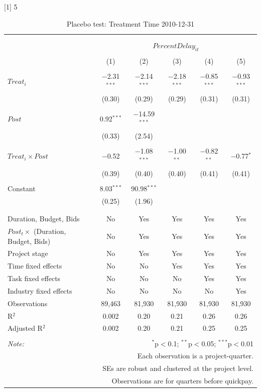 \documentclass[
]{article}
\begin{document}
{[}1{]} 5

\begin{table}[H] \centering 
  \caption{Placebo test: Treatment Time 2010-12-31} 
  \label{} 
\small 
\begin{tabular}{@{\extracolsep{-2pt}}lccccc} 
\\[-1.8ex]\hline 
\hline \\[-1.8ex] 
\\[-1.8ex] & \multicolumn{5}{c}{$PercentDelay_{it}$} \\ 
\\[-1.8ex] & (1) & (2) & (3) & (4) & (5)\\ 
\hline \\[-1.8ex] 
 $Treat_i$ & $-$2.31$^{***}$ & $-$2.14$^{***}$ & $-$2.18$^{***}$ & $-$0.85$^{***}$ & $-$0.93$^{***}$ \\ 
  & (0.30) & (0.29) & (0.29) & (0.31) & (0.31) \\ 
  & & & & & \\ 
 $Post$ & 0.92$^{***}$ & $-$14.59$^{***}$ &  &  &  \\ 
  & (0.33) & (2.54) &  &  &  \\ 
  & & & & & \\ 
 $Treat_i \times Post$ & $-$0.52 & $-$1.08$^{***}$ & $-$1.00$^{**}$ & $-$0.82$^{**}$ & $-$0.77$^{*}$ \\ 
  & (0.39) & (0.40) & (0.40) & (0.41) & (0.41) \\ 
  & & & & & \\ 
 Constant & 8.03$^{***}$ & 90.98$^{***}$ &  &  &  \\ 
  & (0.25) & (1.96) &  &  &  \\ 
  & & & & & \\ 
\hline \\[-1.8ex] 
Duration, Budget, Bids & No & Yes & Yes & Yes & Yes \\ 
$Post_t \times$  (Duration, Budget, Bids) & No & Yes & Yes & Yes & Yes \\ 
Project stage & No & Yes & Yes & Yes & Yes \\ 
Time fixed effects & No & No & Yes & Yes & Yes \\ 
Task fixed effects & No & No & No & Yes & Yes \\ 
Industry fixed effects & No & No & No & No & Yes \\ 
Observations & 89,463 & 81,930 & 81,930 & 81,930 & 81,930 \\ 
R$^{2}$ & 0.002 & 0.20 & 0.21 & 0.26 & 0.26 \\ 
Adjusted R$^{2}$ & 0.002 & 0.20 & 0.21 & 0.25 & 0.25 \\ 
\hline 
\hline \\[-1.8ex] 
\textit{Note:}  & \multicolumn{5}{r}{$^{*}$p$<$0.1; $^{**}$p$<$0.05; $^{***}$p$<$0.01} \\ 
 & \multicolumn{5}{r}{Each observation is a project-quarter.} \\ 
 & \multicolumn{5}{r}{SEs are robust and clustered at the project level.} \\ 
 & \multicolumn{5}{r}{Observations are for quarters before quickpay.} \\ 
\end{tabular} 
\end{table}
\end{document}
